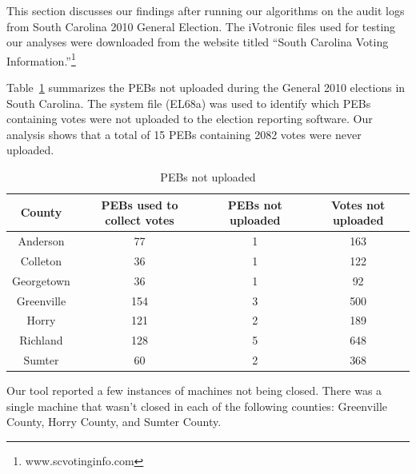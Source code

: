 \smvertspace
This section discusses our findings after running our algorithms on
the audit logs from South Carolina 2010 General Election.  The iVotronic
files used for testing our analyses were downloaded from the website
titled \textquotedblleft South Carolina Voting
Information.\textquotedblright \footnote{www.scvotinginfo.com} 

\smvertspace
Table~\ref{tab:pebs} summarizes the PEBs not uploaded during the
General 2010 elections in South Carolina. The system file (EL68a) was
used to identify which PEBs containing votes were not uploaded to the
election reporting software. Our analysis shows that a total of 15
PEBs containing 2082 votes were never uploaded.

\begin{table}
    \begin{center}
    \begin{tabular}{| c | c | c | c |}
    \hline                   
    County &PEBs used to collect votes &PEBs not uploaded &Votes not uploaded\\
    \hline
    Anderson &77 &1 &163\\
    \hline
    Colleton &36 &1 &122\\
    \hline
    Georgetown &36 &1 &92\\
    \hline
    Greenville &154 &3 &500\\
    \hline
    Horry &121 &2 &189\\
    \hline
    Richland &128 &5 &648\\
    \hline
    Sumter &60 &2 &368\\
    \hline
    \end{tabular}
    \end{center}
    \caption{PEBs not uploaded}
    \label{tab:pebs}
\end{table}

Our tool reported a few instances of machines not being closed.  There was a single machine that wasn't closed in each of the following counties: Greenville County, Horry County, and Sumter County.  

